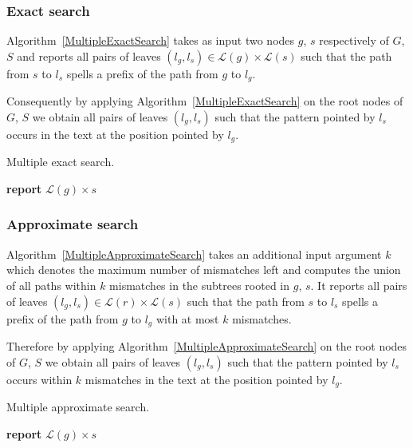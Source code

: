 \documentclass[a4,center,fleqn]{article}
\newcommand{\Report}{\textbf{report }}
\begin{document}
\subsubsection{Exact search}

Algorithm~\ref{MultipleExactSearch} takes as input two nodes $g$, $s$ respectively of $G$, $S$ and reports all pairs of leaves $(l_g, l_s) \in \mathcal{L}(g) \times \mathcal{L}(s)$ such that the path from $s$ to $l_s$ spells a prefix of the path from $g$ to $l_g$.


Consequently by applying Algorithm~\ref{MultipleExactSearch} on the root nodes of $G$, $S$ we obtain all pairs of leaves $(l_g, l_s)$ such that the pattern pointed by $l_s$ occurs in the text at the position pointed by $l_g$.

\vspace*{2mm}
\begin{algorithm}
\caption{Multiple exact search.}
\label{MultipleExactSearch}
\begin{algorithmic}[1]
		\State \Report $\mathcal{L}(g) \times s$
	\Else
				\State {}
			\EndIf
		\EndFor
	\EndIf
\EndProcedure
\end{algorithmic}
\end{algorithm}

\subsubsection{Approximate search}

Algorithm~\ref{MultipleApproximateSearch} takes an additional input argument $k$ which denotes the maximum number of mismatches left and computes the union of all paths within $k$ mismatches in the subtrees rooted in $g$, $s$. It reports all pairs of leaves $(l_g, l_s) \in \mathcal{L}(r) \times \mathcal{L}(s)$ such that the path from $s$ to $l_s$ spells a prefix of the path from $g$ to $l_g$ with at most $k$ mismatches.

Therefore by applying Algorithm~\ref{MultipleApproximateSearch} on the root nodes of $G$, $S$ we obtain all pairs of leaves $(l_g, l_s)$ such that the pattern pointed by $l_s$ occurs within $k$ mismatches in the text at the position pointed by $l_g$.

\vspace*{2mm}
\begin{algorithm}
\caption{Multiple approximate search.}
\label{MultipleApproximateSearch}
\begin{algorithmic}[1]
		\State {}
	\Else
			\State \Report $\mathcal{L}(g) \times s$
		\Else
						\State {}
					\Else
						\State {}
					\EndIf
				\EndFor
			\EndFor
		\EndIf
	\EndIf
\EndProcedure
\end{algorithmic}
\end{algorithm}
\end{document}
